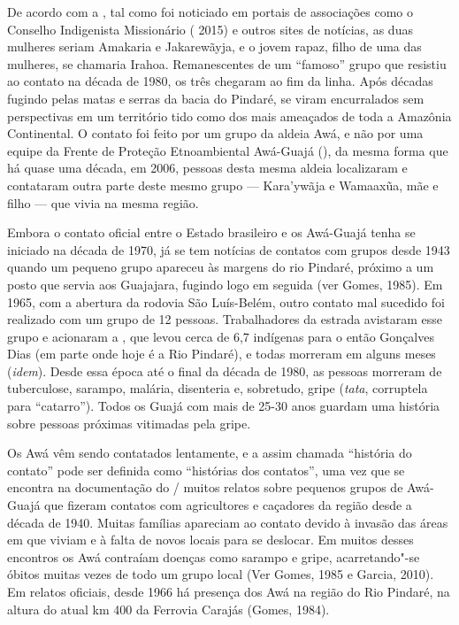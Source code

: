De acordo com a , tal como foi noticiado em portais de associações
como o Conselho Indigenista Missionário ( 2015) e outros sites de
notícias, as duas mulheres seriam Amakaria e Jakarewãyja, e o jovem
rapaz, filho de uma das mulheres, se chamaria Irahoa. Remanescentes de
um ``famoso'' grupo que resistiu ao contato na década de 1980, os três
chegaram ao fim da linha. Após décadas fugindo pelas matas e serras da
bacia do Pindaré, se viram encurralados sem perspectivas em um
território tido como dos mais ameaçados de toda a Amazônia Continental.
O contato foi feito por um grupo da aldeia Awá, e não por uma equipe da
Frente de Proteção Etnoambiental Awá-Guajá (), da mesma forma que
há quase uma década, em 2006, pessoas desta mesma aldeia localizaram e
contataram outra parte deste mesmo grupo --- Kara'ywãja e Wamaaxũa, mãe e
filho --- que vivia na mesma região.

Embora o contato oficial entre o Estado brasileiro e os Awá-Guajá tenha
se iniciado na década de 1970, já se tem notícias de contatos com grupos
desde 1943 quando um pequeno grupo apareceu às margens do rio Pindaré,
próximo a um posto que servia aos Guajajara, fugindo logo em seguida
(ver Gomes, 1985). Em 1965, com a abertura da rodovia São Luís-Belém,
outro contato mal sucedido foi realizado com um grupo de 12 pessoas.
Trabalhadores da estrada avistaram esse grupo e acionaram a , que
levou cerca de 6,7 indígenas para o então  Gonçalves Dias (em parte
onde hoje é a  Rio Pindaré), e todas morreram em alguns meses (\emph{idem}).
Desde essa época até o final da década de 1980, as pessoas morreram de
tuberculose, sarampo, malária, disenteria e, sobretudo, gripe
(\emph{tata}, corruptela para ``catarro''). Todos os Guajá com mais de
25-30 anos guardam uma história sobre pessoas próximas vitimadas pela
gripe.

Os Awá vêm sendo contatados lentamente, e a assim chamada ``história do
contato'' pode ser definida como ``histórias dos contatos'', uma vez que
se encontra na documentação do / muitos relatos sobre pequenos
grupos de Awá-Guajá que fizeram contatos com agricultores e caçadores da
região desde a década de 1940. Muitas famílias apareciam ao contato
devido à invasão das áreas em que viviam e à falta de novos locais para
se deslocar. Em muitos desses encontros os Awá contraíam doenças como
sarampo e gripe, acarretando"-se óbitos muitas vezes de todo um grupo
local (Ver Gomes, 1985 e Garcia, 2010). Em relatos oficiais, desde 1966 há
presença dos Awá na região do Rio Pindaré, na altura do atual km 400 da
Ferrovia Carajás (Gomes, 1984).

